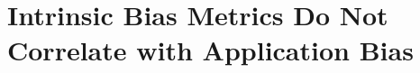 \chapter{Intrinsic Bias Metrics Do Not Correlate with Application Bias}\label{chapter:intrinsic_bias_metrics}

